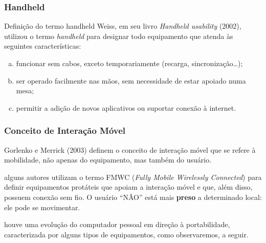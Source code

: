 \documentclass[presentation]{beamer}
\begin{document}
\begin{frame}[c]\frametitle{Handheld}
    
    \begin{block}{Definição do termo handheld}
        Weiss, em seu livro \textit{Handheld usability} (2002), utilizou o termo \textit{handheld} para designar todo equipamento que atenda às seguintes características:
        \begin{enumerate}[a)]
            \item funcionar sem cabos, exceto temporariamente (recarga, sincronização\ldots);
            \item ser operado facilmente nas mãos, sem necessidade de estar apoiado numa mesa;
            \item permitir a adição de novos aplicativos ou suportar conexão à internet.
        \end{enumerate}
    \end{block}

\end{frame}

\begin{frame}[c]\frametitle{Conceito de Interação Móvel}

    \begin{block}{}
        Gorlenko e Merrick (2003) definem o conceito de interação móvel que se refere à mobilidade, não apenas do equipamento, mas também do usuário.
    \end{block}
 
    alguns autores utilizam o termo FMWC (\textit{Fully Mobile Wirelessly Connected}) para definir equipamentos protáteis que apoiam a interação móvel e que, além disso, possuem conexão sem fio. O usuário ``NÃO'' está mais \textbf{preso} a determinado local: ele pode se movimentar.

    houve uma evolução do computador pessoal em direção à portabilidade, caracterizada por alguns tipos de equipamentos, como observaremos, a seguir.

\end{frame}
\end{document}
